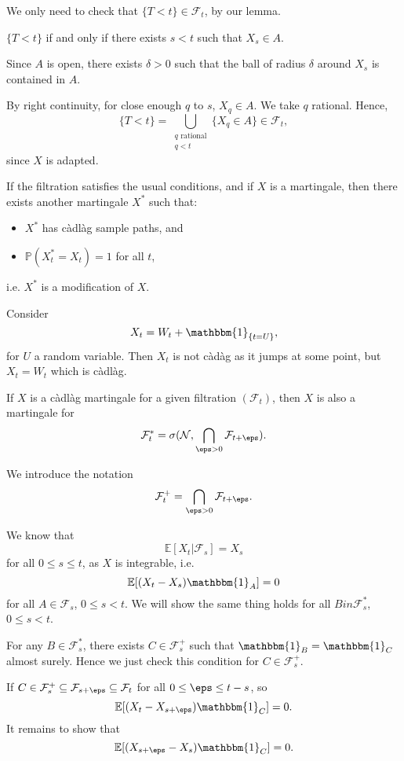 \documentclass[12pt]{article}
\begin{document}
\begin{proofbox}
	We only need to check that $\{T < t\} \in \mathcal{F}_t$, by our lemma.

	$\{T < t\}$ if and only if there exists $s < t$ such that $X_s \in A$.

	Since $A$ is open, there exists $\delta > 0$ such that the ball of radius $\delta$ around $X_s$ is contained in $A$.

	By right continuity, for close enough $q$ to $s$, $X_q \in A$. We take $q$ rational. Hence,
	\[
		\{T < t\} = \bigcup_{\substack{q \text{ rational} \\ q < t}} \{X_q \in A\} \in \mathcal{F}_t,
	\]
	since $X$ is adapted.
\end{proofbox}

\begin{theorem}
	If the filtration satisfies the usual conditions, and if $X$ is a martingale, then there exists another martingale $X^{\ast}$ such that:
	\begin{itemize}
		\item $X^{\ast}$ has c\`adl\`ag sample paths, and
		\item $\mathbb{P}(X^{\ast}_t = X_t) = 1$ for all $t$,
	\end{itemize}
	i.e. $X^{\ast}$ is a modification of $X$.
\end{theorem}

\begin{exbox}
	Consider
	\[
		X_t = W_t + \mathbbm{1}_{\{t = U\}},
	\]
	for $U$ a random variable. Then $X_t$ is not c\`ad\`ag as it jumps at some point, but $X_t = W_t$ which is c\`adl\`ag.
\end{exbox}

\begin{theorem}
	If $X$ is a c\`adl\`ag martingale for a given filtration $(\mathcal{F}_t)$, then $X$ is also a martingale for
	\[
	\mathcal{F}_t^{\ast} = \sigma(\mathcal{N}, \bigcap_{\eps > 0} \mathcal{F}_{t + \eps} ).
	\]
\end{theorem}

We introduce the notation
\[
\mathcal{F}_t^{+} = \bigcap_{\eps > 0} \mathcal{F}_{t + \eps}.
\]

\begin{proofbox}
	We know that
	\[
	\mathbb{E}[X_t | \mathcal{F}_s] = X_s
	\]
	for all $0 \leq s \leq t$, as $X$ is integrable, i.e.
	\[
	\mathbb{E}[(X_t - X_s) \mathbbm{1}_{A}] = 0
	\]
	for all $A \in \mathcal{F}_s$, $0 \leq s < t$. We will show the same thing holds for all $B in \mathcal{F}_s^{\ast}$, $0 \leq s < t$.

	For any $B \in \mathcal{F}_s^{\ast}$, there exists $C \in \mathcal{F}_{s}^{+}$ such that $\mathbbm{1}_{B} = \mathbbm{1}_{C}$ almost surely. Hence we just check this condition for $C \in \mathcal{F}_{s}^{+}$.

	If $C \in \mathcal{F}_{s}^{+} \subseteq \mathcal{F}_{s + \eps} \subseteq \mathcal{F}_t$ for all $0 \leq \eps \leq t - s$, so
	\[
	\mathbb{E}[(X_t - X_{s + \eps})\mathbbm{1}_{C}] = 0.
	\]
	It remains to show that
	\[
	\mathbb{E}[(X_{s + \eps} - X_s) \mathbbm{1}_{C}] = 0.
	\]
\end{proofbox}
\end{document}

